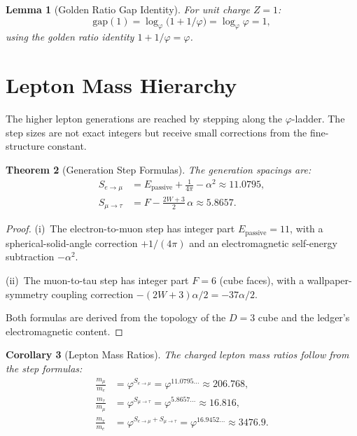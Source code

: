 \documentclass[12pt,a4paper]{article}
\newtheorem{theorem}{Theorem}[section]
\newtheorem{lemma}[theorem]{Lemma}
\newtheorem{corollary}[theorem]{Corollary}
\theoremstyle{definition}
\theoremstyle{remark}
\begin{document}
\begin{lemma}[Golden Ratio Gap Identity]
\label{lem:gap}
For unit charge $Z = 1$:
\begin{equation}
  \mathrm{gap}(1) = \log_\varphi\!\bigl(1 + 1/\varphi\bigr)
  = \log_\varphi \varphi = 1,
\end{equation}
using the golden ratio identity $1 + 1/\varphi = \varphi$.
\end{lemma}

\section{Lepton Mass Hierarchy}
\label{sec:hierarchy}

The higher lepton generations are reached by stepping along the
$\varphi$-ladder.  The step sizes are not exact integers but
receive small corrections from the fine-structure constant.

\begin{theorem}[Generation Step Formulas]
\label{thm:steps}
The generation spacings are:
\begin{align}
  S_{e \to \mu} &= E_{\mathrm{passive}} + \frac{1}{4\pi}
  - \alpha^2 \approx 11.0795,
  \label{eq:step1} \\
  S_{\mu \to \tau} &= F - \frac{2W + 3}{2}\,\alpha
  \approx 5.8657.
  \label{eq:step2}
\end{align}
\end{theorem}

\begin{proof}
(i)~The electron-to-muon step has integer part
$E_{\mathrm{passive}} = 11$, with a spherical-solid-angle
correction $+1/(4\pi)$ and an electromagnetic self-energy
subtraction $-\alpha^2$.

(ii)~The muon-to-tau step has integer part $F = 6$ (cube faces),
with a wallpaper-symmetry coupling correction
$-(2W + 3)\alpha/2 = -37\alpha/2$.

Both formulas are derived from the topology of the $D = 3$
cube and the ledger's electromagnetic content.
\end{proof}

\begin{corollary}[Lepton Mass Ratios]
\label{cor:ratios}
The charged lepton mass ratios follow from the step formulas:
\begin{align}
  \frac{m_\mu}{m_e} &= \varphi^{S_{e \to \mu}}
    = \varphi^{11.0795\ldots} \approx 206.768, \\
  \frac{m_\tau}{m_\mu} &= \varphi^{S_{\mu \to \tau}}
    = \varphi^{5.8657\ldots} \approx 16.816, \\
  \frac{m_\tau}{m_e} &= \varphi^{S_{e \to \mu} +
    S_{\mu \to \tau}} = \varphi^{16.9452\ldots} \approx 3476.9.
\end{align}
\end{corollary}
\end{document}
